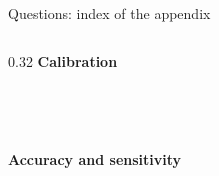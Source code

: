 \documentclass[aspectratio=169,11pt]{beamer}
\begin{document}
\begin{frame}[label=qindex]{Questions: index of the appendix}
\begin{columns}[T]
\begin{column}{0.32\textwidth}
{\color{c3}\textbf{Calibration}}\\[1pt]
\hyperlink{bk2}{}\\[0pt]
\hyperlink{bk3}{}\\[0pt]
\hyperlink{bk4}{}\\[0pt]
\hyperlink{bk15}{}\\[5pt]
{\color{p3}\textbf{Accuracy and sensitivity}}\\[1pt]
\hyperlink{appI}{}\\[0pt]
\hyperlink{appJ}{}\\[0pt]
\hyperlink{bk5}{}\\[0pt]
\hyperlink{bk6}{}\\[0pt]
\hyperlink{bk16}{}\\[5pt]
\end{column}
\end{columns}
\end{frame}
\end{document}
